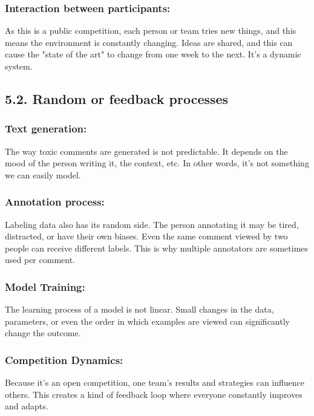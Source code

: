 \documentclass[a4paper,12pt]{article}
\begin{document}
\subsubsection*{Interaction between participants:}
As this is a public competition, each person or team tries new things, and this means the environment is constantly changing. Ideas are shared, and this can cause the "state of the art" to change from one week to the next. It's a dynamic system.

\subsection*{5.2. Random or feedback processes}

\subsubsection*{Text generation:}
The way toxic comments are generated is not predictable. It depends on the mood of the person writing it, the context, etc. In other words, it's not something we can easily model.

\subsubsection*{Annotation process:}
Labeling data also has its random side. The person annotating it may be tired, distracted, or have their own biases. Even the same comment viewed by two people can receive different labels. This is why multiple annotators are sometimes used per comment.

\subsubsection*{Model Training:}
The learning process of a model is not linear. Small changes in the data, parameters, or even the order in which examples are viewed can significantly change the outcome.

\subsubsection*{Competition Dynamics:}
Because it's an open competition, one team's results and strategies can influence others. This creates a kind of feedback loop where everyone constantly improves and adapts.
\end{document}
